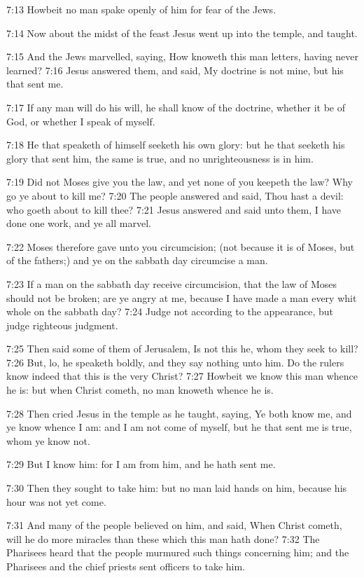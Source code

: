 7:13 Howbeit no man spake openly of him for fear of the Jews.

7:14 Now about the midst of the feast Jesus went up into the temple, and taught.

7:15 And the Jews marvelled, saying, How knoweth this man letters, having never learned?  7:16 Jesus answered them, and said, My doctrine is not mine, but his that sent me.

7:17 If any man will do his will, he shall know of the doctrine, whether it be of God, or whether I speak of myself.

7:18 He that speaketh of himself seeketh his own glory: but he that seeketh his glory that sent him, the same is true, and no unrighteousness is in him.

7:19 Did not Moses give you the law, and yet none of you keepeth the law?  Why go ye about to kill me?  7:20 The people answered and said, Thou hast a devil: who goeth about to kill thee?  7:21 Jesus answered and said unto them, I have done one work, and ye all marvel.

7:22 Moses therefore gave unto you circumcision; (not because it is of Moses, but of the fathers;) and ye on the sabbath day circumcise a man.

7:23 If a man on the sabbath day receive circumcision, that the law of Moses should not be broken; are ye angry at me, because I have made a man every whit whole on the sabbath day?  7:24 Judge not according to the appearance, but judge righteous judgment.

7:25 Then said some of them of Jerusalem, Is not this he, whom they seek to kill?  7:26 But, lo, he speaketh boldly, and they say nothing unto him. Do the rulers know indeed that this is the very Christ?  7:27 Howbeit we know this man whence he is: but when Christ cometh, no man knoweth whence he is.

7:28 Then cried Jesus in the temple as he taught, saying, Ye both know me, and ye know whence I am: and I am not come of myself, but he that sent me is true, whom ye know not.

7:29 But I know him: for I am from him, and he hath sent me.

7:30 Then they sought to take him: but no man laid hands on him, because his hour was not yet come.

7:31 And many of the people believed on him, and said, When Christ cometh, will he do more miracles than these which this man hath done?  7:32 The Pharisees heard that the people murmured such things concerning him; and the Pharisees and the chief priests sent officers to take him.

